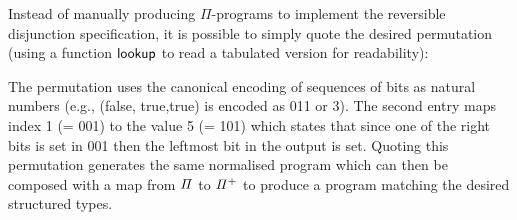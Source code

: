 \medskip
\resetnormtwo{}

Instead of manually producing $\Pi$-programs to implement the reversible disjunction specification, it is possible to
simply quote the desired permutation (using a function $\operatorname{\mathsf{lookup}}$ to read a tabulated version for readability):

\medskip
\resetperm{}
 
\noindent The permutation uses the canonical encoding of sequences of bits as natural numbers (e.g., (\textsf{false},
\textsf{true},\textsf{true}) is encoded as 011 or 3).  The second entry maps index 1 (= 001) to the value 5 (= 101)
which states that since one of the right bits is set in 001 then the leftmost bit in the output is set. Quoting this
permutation generates the same normalised program which can then be composed with a map from $\mathit{\Pi}$ to
$\mathit{{\Pi}^{+}}$ to produce a program matching the desired structured types.






